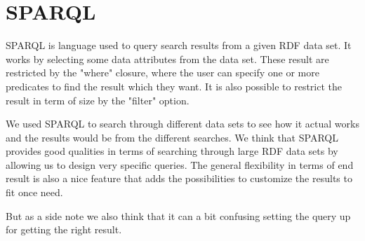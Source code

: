 \section{SPARQL}
SPARQL is language used to query search results from a given RDF data set. It works by selecting some data attributes from the data set. These result are restricted by the "where" closure, where the user can specify one or more predicates to find the result which they want. It is also possible to restrict the result in term of size by the "filter" option.

We used SPARQL to search through different data sets to see how it actual works and the results would be from the different searches. We think that SPARQL provides good qualities in terms of searching through large RDF data sets by allowing us to design very specific queries. The general flexibility in terms of end result is also a nice feature that adds the possibilities to customize the results to fit once need.

But as a side note we also think that it can a bit confusing setting the query up for getting the right result.